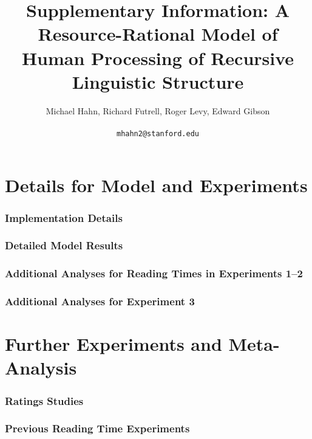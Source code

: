 \documentclass[11pt,a4paper]{article}
\title{Supplementary Information: A Resource-Rational Model of Human Processing of Recursive Linguistic Structure}
\author{Michael Hahn, Richard Futrell, Roger Levy, Edward Gibson \\ \\ \texttt{mhahn2@stanford.edu}}
\begin{document}
\maketitle



\tableofcontents

\newpage
\part{Details for Model and Experiments}

\section{Implementation Details}\label{sec:implementation}


\newpage
\section{Detailed Model Results}






\newpage
\section{Additional Analyses for Reading Times in Experiments 1--2}


\newpage
\section{Additional Analyses for Experiment 3}





\newpage
\part{Further Experiments and Meta-Analysis}


\section{Ratings Studies}\label{sec:ratings-studies}



\newpage
\section{Previous Reading Time Experiments}\label{sec:previous}

\end{document}
